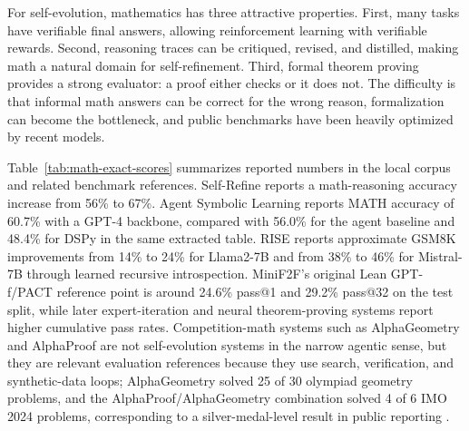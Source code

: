 For self-evolution, mathematics has three attractive properties. First, many tasks have verifiable final answers, allowing reinforcement learning with verifiable rewards. Second, reasoning traces can be critiqued, revised, and distilled, making math a natural domain for self-refinement. Third, formal theorem proving provides a strong evaluator: a proof either checks or it does not. The difficulty is that informal math answers can be correct for the wrong reason, formalization can become the bottleneck, and public benchmarks have been heavily optimized by recent models.

Table~\ref{tab:math-exact-scores} summarizes reported numbers in the local corpus and related benchmark references. Self-Refine reports a math-reasoning accuracy increase from 56\% to 67\%. Agent Symbolic Learning reports MATH accuracy of 60.7\% with a GPT-4 backbone, compared with 56.0\% for the agent baseline and 48.4\% for DSPy in the same extracted table. RISE reports approximate GSM8K improvements from 14\% to 24\% for Llama2-7B and from 38\% to 46\% for Mistral-7B through learned recursive introspection. MiniF2F's original Lean GPT-f/PACT reference point is around 24.6\% pass@1 and 29.2\% pass@32 on the test split, while later expert-iteration and neural theorem-proving systems report higher cumulative pass rates. Competition-math systems such as AlphaGeometry and AlphaProof are not self-evolution systems in the narrow agentic sense, but they are relevant evaluation references because they use search, verification, and synthetic-data loops; AlphaGeometry solved 25 of 30 olympiad geometry problems, and the AlphaProof/AlphaGeometry combination solved 4 of 6 IMO 2024 problems, corresponding to a silver-medal-level result in public reporting \cite{alphageometry2024,alphaproof2024}.

